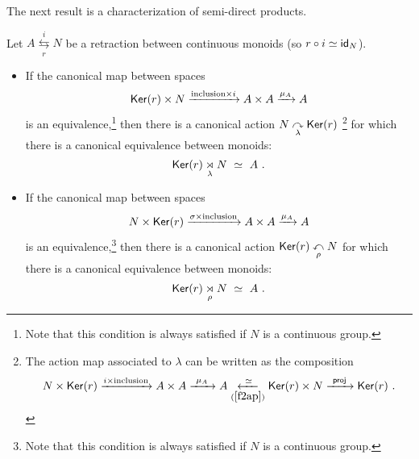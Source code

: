 The next result is a characterization of semi-direct products.  
\begin{lemma}
\label{t67}
Let $A \overset{i}{\underset{r} \leftrightarrows} N$ be a retraction between continuous monoids (so $r \circ i \simeq \operatorname{\sf id}_N$).
\begin{itemize}

\item
If the canonical map between spaces
\begin{equation}
\label{f2ap}
\operatorname{\sf Ker}(r) 
\times 
N
\xrightarrow{ {\rm inclusion} \times i }
A \times A
\xrightarrow{\mu_A}
A
\end{equation}
is an equivalence,\footnote{Note that this condition is always satisfied if $N$ is a continuous group.}
then there is a canonical action $N \underset{\lambda}{\curvearrowright} \operatorname{\sf Ker}(r)$ \footnote{
The action map associated to $\lambda$ can be written as the composition
\[
N
\times
\operatorname{\sf Ker}(r)
\xrightarrow{ i \times {\rm inclusion}}
A \times A
\xrightarrow{~\mu_A~}
A
\underset{(\ref{f2ap})}{\xleftarrow{~\simeq~}}
\operatorname{\sf Ker}(r)\times N
\xrightarrow{~\sf proj~}
\operatorname{\sf Ker}(r)
~.
\]
}
for which there is a canonical equivalence between monoids:
\[
\operatorname{\sf Ker}(r) \underset{\lambda} \rtimes N
~\simeq~
A
~.
\]


\item
If the canonical map between spaces
\[
N
\times 
\operatorname{\sf Ker}(r) 
\xrightarrow{ \sigma \times {\rm inclusion} }
A \times A
\xrightarrow{\mu_A}
A
\]
is an equivalence,\footnote{Note that this condition is always satisfied if $N$ is a continuous group.}
then there is a canonical action $\operatorname{\sf Ker}(r) \underset{\rho}{\curvearrowleft} N $ for which there is a canonical equivalence between monoids:
\[
\operatorname{\sf Ker}(r) \underset{\rho} \rtimes N
~\simeq~
A
~.
\]


\end{itemize}



\end{lemma}

